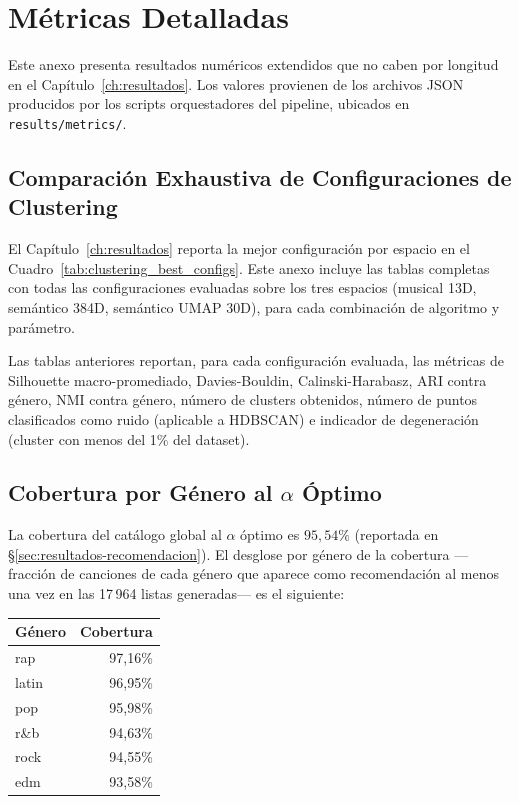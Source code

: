 \chapter{Métricas Detalladas}
\label{app:metricas}

Este anexo presenta resultados numéricos extendidos que no caben por longitud en el Capítulo~\ref{ch:resultados}. Los valores provienen de los archivos JSON producidos por los scripts orquestadores del pipeline, ubicados en \texttt{results/metrics/}.

\section{Comparación Exhaustiva de Configuraciones de Clustering}
\label{sec:clustering-exhaustivo}

El Capítulo~\ref{ch:resultados} reporta la mejor configuración por espacio en el Cuadro~\ref{tab:clustering_best_configs}. Este anexo incluye las tablas completas con todas las configuraciones evaluadas sobre los tres espacios (musical 13D, semántico 384D, semántico UMAP 30D), para cada combinación de algoritmo y parámetro.







Las tablas anteriores reportan, para cada configuración evaluada, las métricas de Silhouette macro-promediado, Davies-Bouldin, Calinski-Harabasz, ARI contra género, NMI contra género, número de clusters obtenidos, número de puntos clasificados como ruido (aplicable a HDBSCAN) e indicador de degeneración (cluster con menos del 1\% del dataset).

\section{Cobertura por Género al $\alpha$ Óptimo}
\label{sec:cobertura-genero-extendida}

La cobertura del catálogo global al $\alpha$ óptimo es $95{,}54\%$ (reportada en §\ref{sec:resultados-recomendacion}). El desglose por género de la cobertura ---fracción de canciones de cada género que aparece como recomendación al menos una vez en las 17\,964 listas generadas--- es el siguiente:

\begin{center}
\begin{tabular}{lr}
    \toprule
    Género & Cobertura \\
    \midrule
    rap & 97{,}16\% \\
    latin & 96{,}95\% \\
    pop & 95{,}98\% \\
    r\&b & 94{,}63\% \\
    rock & 94{,}55\% \\
    edm & 93{,}58\% \\
    \bottomrule
\end{tabular}
\end{center}


